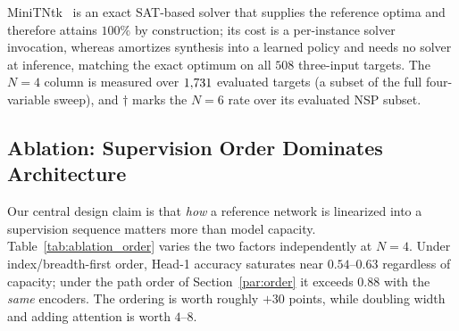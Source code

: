 \begin{table}[t]
\centering
\caption{Optimality rate (\%): fraction reaching the exact SAT optimum.
         Parenthesized counts are the targets evaluated; both phases of the
         $N{=}4$ column are over the same $\NfourEval$-target subset of the full
         four-variable sweep, and $\dagger$ marks the $N{=}6$ rate over its
         evaluated NSP subset.}
\label{tab:main}
\end{table}

\noindent
MiniTNtk~\cite{miniTNtk} is an exact SAT-based solver that supplies the reference
optima and therefore attains $100\%$ by construction; its cost is a
per-instance solver invocation, whereas \method{} amortizes synthesis into a
learned policy and needs no solver at inference, matching the exact optimum on
all $508$ three-input targets.
The $N{=}4$ column is measured over $\NfourEval$ evaluated targets (a subset of
the full four-variable sweep), and $\dagger$ marks the $N{=}6$ rate over its
evaluated NSP subset.

\subsection{Ablation: Supervision Order Dominates Architecture}
\label{sec:ablation_order}

Our central design claim is that \emph{how} a reference network is linearized
into a supervision sequence matters more than model capacity.
Table~\ref{tab:ablation_order} varies the two factors independently at
$N=4$.  Under index/breadth-first order, Head-1 accuracy saturates near
$0.54$--$0.63$ regardless of capacity; under the path order of
Section~\ref{par:order} it exceeds $0.88$ with the \emph{same} encoders.
The ordering is worth roughly $+30$ points, while doubling width and adding
attention is worth $4$--$8$.

\begin{table}[t]
\centering
\caption{Head-1 (source-selection) accuracy at $N{=}4$:
         architecture $\times$ supervision order.}
\label{tab:ablation_order}
\end{table}


